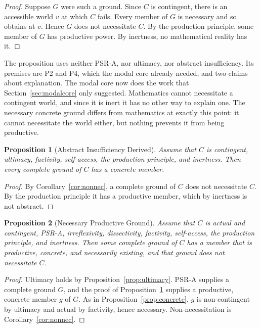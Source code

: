 \documentclass[11pt,letterpaper]{article}
\theoremstyle{plain}
\newtheorem{proposition}{Proposition}
\theoremstyle{definition}
\begin{document}
\begin{proof}
Suppose $G$ were such a ground. Since $C$ is contingent, there is an accessible world $v$ at which $C$ fails. Every member of $G$ is necessary and so obtains at $v$. Hence $G$ does not necessitate $C$. By the production principle, some member of $G$ has productive power. By inertness, no mathematical reality has it.
\end{proof}

The proposition uses neither PSR-A, nor ultimacy, nor abstract insufficiency. Its premises are P2 and P4, which the modal core already needed, and two claims about explanation. The modal core now does the work that Section~\ref{sec:modalcore} only suggested. Mathematics cannot necessitate a contingent world, and since it is inert it has no other way to explain one. The necessary concrete ground differs from mathematics at exactly this point: it cannot necessitate the world either, but nothing prevents it from being productive.

\begin{proposition}[Abstract Insufficiency Derived]\label{prop:aiderived}
Assume that $C$ is contingent, ultimacy, factivity, self-access, the production principle, and inertness. Then every complete ground of $C$ has a concrete member.
\end{proposition}

\begin{proof}
By Corollary~\ref{cor:nonnec}, a complete ground of $C$ does not necessitate $C$. By the production principle it has a productive member, which by inertness is not abstract.
\end{proof}

\begin{proposition}[Necessary Productive Ground]\label{prop:productive}
Assume that $C$ is actual and contingent, PSR-A, irreflexivity, dissectivity, factivity, self-access, the production principle, and inertness. Then some complete ground of $C$ has a member that is productive, concrete, and necessarily existing, and that ground does not necessitate $C$.
\end{proposition}

\begin{proof}
Ultimacy holds by Proposition~\ref{prop:ultimacy}. PSR-A supplies a complete ground $G$, and the proof of Proposition~\ref{prop:aiderived} supplies a productive, concrete member $g$ of $G$. As in Proposition~\ref{prop:concrete}, $g$ is non-contingent by ultimacy and actual by factivity, hence necessary. Non-necessitation is Corollary~\ref{cor:nonnec}.
\end{proof}
\end{document}
